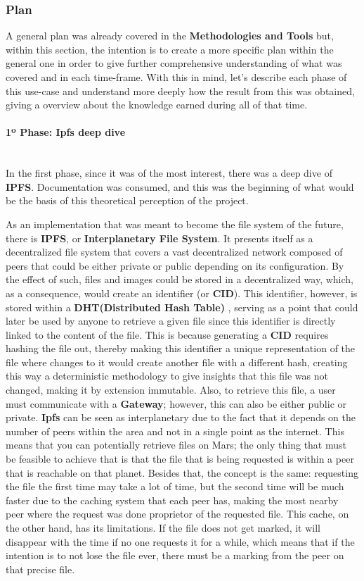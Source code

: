 \subsubsection{Plan}
A general plan was already covered in the \textbf{Methodologies and Tools} but, within this section, the intention is to create a more specific plan within the general one in order to give further comprehensive understanding of what was covered and in each time-frame. With this in mind, let's describe each phase of this use-case and understand more deeply how the result from this was obtained, giving a overview about the knowledge earned during all of that time.

\paragraph{1º Phase: Ipfs deep dive}\mbox{}\\
In the first phase, since it was of the most interest, there was a deep dive of \textbf{IPFS}. Documentation was consumed, and this was the beginning of what would be the basis of this theoretical perception of the project.

As an implementation that was meant to become the file system of the future, there is \textbf{IPFS}, or \textbf{Interplanetary File System}. It presents itself as a decentralized file system that covers a vast decentralized network composed of peers that could be either private or public depending on its configuration. By the effect of such, files and images could be stored in a decentralized way, which, as a consequence, would create an identifier (or \textbf{CID}). This identifier, however, is stored within a \textbf{DHT(Distributed Hash Table)} \cite{DHT}, serving as a point that could later be used by anyone to retrieve a given file since this identifier is directly linked to the content of the file. This is because generating a \textbf{CID} requires hashing the file out, thereby making this identifier a unique representation of the file where changes to it would create another file with a different hash, creating this way a deterministic methodology to give insights that this file was not changed, making it by extension immutable. Also, to retrieve this file, a user must communicate with a \textbf{Gateway}; however, this can also be either public or private. \textbf{Ipfs} can be seen as interplanetary due to the fact that it depends on the number of peers within the area and not in a single point as the internet. This means that you can potentially retrieve files on Mars; the only thing that must be feasible to achieve that is that the file that is being requested is within a peer that is reachable on that planet. Besides that, the concept is the same: requesting the file the first time may take a lot of time, but the second time will be much faster due to the caching system that each peer has, making the most nearby peer where the request was done proprietor of the requested file. This cache, on the other hand, has its limitations. If the file does not get marked, it will disappear with the time if no one requests it for a while, which means that if the intention is to not lose the file ever, there must be a marking from the peer on that precise file.

